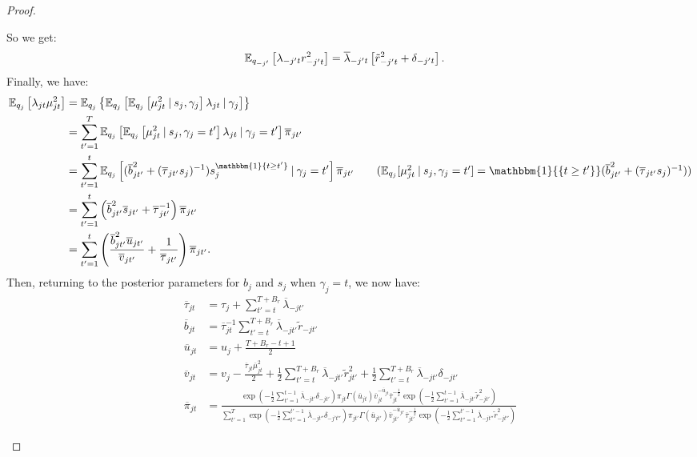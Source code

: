 \begin{proof}
\begin{enumerate}[label=\roman*.]
So we get:
\begin{align*}
    \mathbb{E}_{q_{-j'}}\left[\lambda_{-j't}r^2_{-j't}\right] &= \overline{\lambda}_{-j't}\left[\tilde{r}^2_{-j' t} + \delta_{-j't}\right].
\end{align*}
Finally, we have:
\small
\begin{align*}
    \E_{q_{j}}\left[\lambda_{jt}\mu^2_{jt}\right] &= \E_{q_{j}}\left\{\E_{q_{j}}\left[\E_{q_{j}}\left[\mu^2_{jt}\:|\: s_{j}, \gamma_{j}\right]\lambda_{jt}\:|\: \gamma_{j}\right]\right\} \\
    &= \sum_{t'=1}^T  \E_{q_{j}}\left[\E_{q_{j}}\left[\mu^2_{jt}\:|\: s_{j}, \gamma_{j} = t'\right]\lambda_{jt}\:|\: \gamma_{j}= t'\right] \overline{\pi}_{jt'} \\
    &= \sum_{t'=1}^t \E_{q_{j}}\left[(\overline{b}_{j t'}^2 + (\overline{\tau}_{j t'}s_{j})^{-1})s_j^{\mathbbm{1}\{t \geq t'\}}\:|\: \gamma_j= t'\right] \overline{\pi}_{j t'} \tag{$\E_{q_{j}}[\mu^2_{jt}\:|\: s_j, \gamma_j = t'] = \mathbbm{1}{\{t \geq t'\}} (\overline{b}_{jt'}^2 + (\overline{\tau}_{jt'}s_{j})^{-1})$} \\
    &= \sum_{t'=1}^t \left(\overline{b}^2_{jt'}\overline{s}_{jt'} +\overline{\tau}_{jt'}^{-1}\right) \overline{\pi}_{jt'} \\
    &= \sum_{t'=1}^t \left(\frac{\overline{b}^2_{jt'}\overline{u}_{jt'}}{\overline{v}_{jt'}} +\frac{1}{\overline{\tau}_{jt'}}\right) \overline{\pi}_{jt'}.
\end{align*}
\normalsize
Then, returning to the posterior parameters for $b_{j}$ and $s_{j}$ when $\gamma_{j}=t$, we now have:
\begin{align*}
    \overline{\tau}_{jt} &=  \tau_{j} +  \sum_{t'=t}^{T+B_r} \overline{\lambda}_{-jt'} \\
    \overline{b}_{jt}  &= \overline{\tau}_{jt}^{-1}  \sum_{t'=t}^{T+B_r} \overline{\lambda}_{-jt'}\tilde{r}_{-j t'}\\
    \overline{u}_{jt} &= u_{j} + \frac{T+B_r-t+1}{2} \\
    \overline{v}_{jt} &= v_{j} - \frac{\overline{\tau}_{jt}\overline{\mu}^2_{jt}}{2} + \frac{1}{2}\sum_{t'=t}^{T+B_r}\overline{\lambda}_{-jt'}\tilde{r}^2_{jt'} + \frac{1}{2}\sum_{t'=t}^{T+B_r}\overline{\lambda}_{-jt'}\delta_{-jt'} \\
    \overline{\pi}_{jt}  &= \frac{\exp\left(-\frac{1}{2}\sum_{t'=1}^{t-1}\overline{\lambda}_{-jt'}\delta_{-jt'}\right)\pi_{jt}\Gamma(\overline{u}_{jt})\overline{v}_{jt}^{-\overline{u}_{jt}}\overline{\tau}_{jt}^{-\frac{1}{2}}\exp\left( -\frac{1}{2} \sum_{t'=1}^{t-1} \overline{\lambda}_{-jt'}\tilde{r}_{-jt'}^2 \right)}{\sum_{t'=1}^T \exp\left(-\frac{1}{2}\sum_{t''=1}^{t'-1}\overline{\lambda}_{-jt''}\delta_{-j't''}\right) \pi_{jt'}\Gamma(\overline{u}_{jt'})\overline{v}_{jt'}^{-\overline{u}_{jt'}}\overline{\tau}_{jt'}^{-\frac{1}{2}}\exp\left( -\frac{1}{2} \sum_{t''=1}^{t'-1} \overline{\lambda}_{-jt''}\tilde{r}_{-jt''}^2\right)}

\end{align*}
\end{enumerate}
\end{proof}

